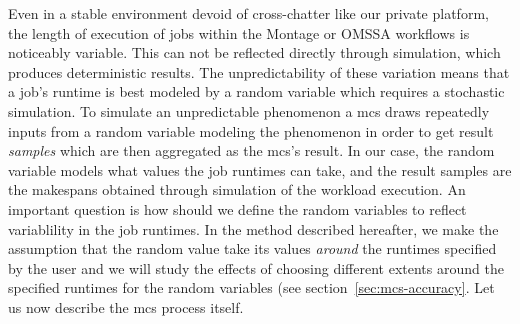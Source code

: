 \documentclass[10pt,conference,compsocconf]{IEEEtran}
\begin{document}
Even in a stable environment devoid  of cross-chatter like our private platform,
the  length of  execution  of jobs  within  the Montage  or  OMSSA workflows  is
noticeably  variable. This  can not  be reflected  directly through  simulation,
which produces  deterministic results.  The unpredictability  of these variation
means that a job's runtime is best modeled by a random variable which requires a
stochastic simulation.  To simulate an unpredictable phenomenon a \ac{mcs} draws
repeatedly inputs from a random variable modeling the phenomenon in order to get
result \emph{samples}  which are then  aggregated as the \ac{mcs}'s  result.  In
our case, the random variable models what  values the job runtimes can take, and
the result samples are the makespans obtained through simulation of the workload
execution.  An important  question is how should we define  the random variables
to reflect variablility in the job  runtimes. In the method described hereafter,
we make the  assumption that the random value take  its values \emph{around} the
runtimes  specified by  the  user and  we  will study  the  effects of  choosing
different extents  around the specified  runtimes for the random  variables (see
section~\ref{sec:mcs-accuracy}. Let us now describe the \ac{mcs} process itself.
\end{document}
